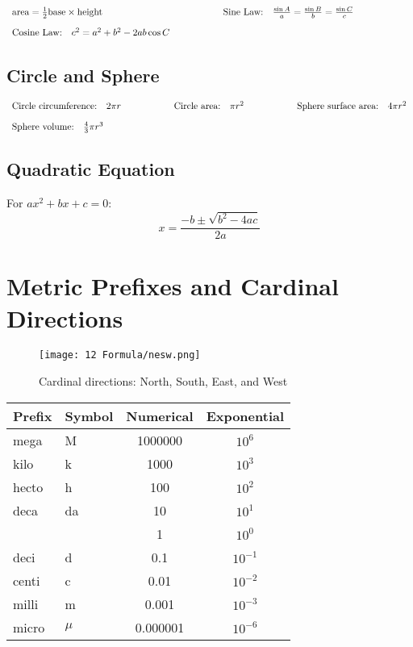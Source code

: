 \documentclass[12pt,a4paper]{article}
\begin{document}
\begin{align*}
  \begin{array}{l@{\hspace{2cm}}l@{\hspace{2cm}}l}
    \text{area} = \frac{1}{2} \text{base} \times \text{height} & \text{Sine Law:} \quad \frac{\sin A}{a} = \frac{\sin B}{b} = \frac{\sin C}{c} & \\[1em]
    \text{Cosine Law:} \quad c^2 = a^2 + b^2 - 2ab \cos C & &
  \end{array}
\end{align*}

\subsection{Circle and Sphere}
\begin{align*}
  \begin{array}{l@{\hspace{2cm}}l@{\hspace{2cm}}l}
    \text{Circle circumference:} \quad 2\pi r & \text{Circle area:} \quad \pi r^2 & \text{Sphere surface area:} \quad 4\pi r^2 \\[1em]
    \text{Sphere volume:} \quad \frac{4}{3}\pi r^3 & &
  \end{array}
\end{align*}

\subsection{Quadratic Equation}
For $ax^2 + bx + c = 0$: 
\[x = \frac{-b \pm \sqrt{b^2 - 4ac}}{2a}\]

\section{Metric Prefixes and Cardinal Directions}
\begin{figure}[H]
    \centering
    \texttt{[image: 12 Formula/nesw.png]}
    \caption{Cardinal directions: North, South, East, and West}
    \label{fig:Cardinal directions}
\end{figure}

\begin{table}[H]
\centering
\begin{tabular}{@{}llcc@{}}
\toprule
Prefix & Symbol & Numerical & Exponential \\
\midrule
mega & M & 1000000 & $10^6$ \\
kilo & k & 1000 & $10^3$ \\
hecto & h & 100 & $10^2$ \\
deca & da & 10 & $10^1$ \\
 &  & 1 & $10^0$ \\
deci & d & 0.1 & $10^{-1}$ \\
centi & c & 0.01 & $10^{-2}$ \\
milli & m & 0.001 & $10^{-3}$ \\
micro & $\mu$ & 0.000001 & $10^{-6}$ \\
\bottomrule
\end{tabular}
\end{table}
\end{document}
